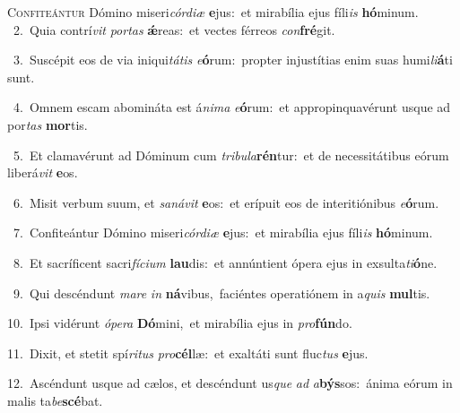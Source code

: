 \lettrine{\initial\textcolor{\initialcolor}{C}}{onfiteántur} Dómino miseri\-\textit{cór}\-\textit{di}\textit{æ} \textbf{e}\-jus:~\star et mirabília ejus fíli\textit{is} \textbf{hó}\-minum.\\
{\numbfont\textcolor{\numbcolor}{~2.}}~Quia contrí\textit{vit} \textit{por}\-\textit{tas} \textbf{ǽ}\-reas:~\star et vectes férreos \textit{con}\-\textbf{fré}git.\par
{\numbfont\textcolor{\numbcolor}{~3.}}~Suscépit eos de via iniqui\-\textit{tá}\-\textit{tis} \textit{e}\-\textbf{ó}rum:~\star propter injustítias enim suas humi\-\textit{li}\-\textbf{á}ti sunt.\par
{\numbfont\textcolor{\numbcolor}{~4.}}~Omnem escam abomináta est á\-\textit{ni}\-\textit{ma} \textit{e}\-\textbf{ó}rum:~\star et appropinquavérunt usque ad por\textit{tas} \textbf{mor}\-tis.\par
{\numbfont\textcolor{\numbcolor}{~5.}}~Et clamavérunt ad Dóminum cum \textit{tri}\-\textit{bu}\textit{la}\textbf{rén}tur:~\star et de necessitátibus eórum liberá\textit{vit} \textbf{e}\-os.\par
{\numbfont\textcolor{\numbcolor}{~6.}}~Misit verbum suum, et \textit{sa}\-\textit{ná}\textit{vit} \textbf{e}\-os:~\star et erípuit eos de interitiónibus \textit{e}\-\textbf{ó}rum.\par
{\numbfont\textcolor{\numbcolor}{~7.}}~Confiteántur Dómino miseri\-\textit{cór}\-\textit{di}\textit{æ} \textbf{e}\-jus:~\star et mirabília ejus fíli\textit{is} \textbf{hó}\-minum.\par
{\numbfont\textcolor{\numbcolor}{~8.}}~Et sacríficent sacri\-\textit{fí}\-\textit{ci}\textit{um} \textbf{lau}\-dis:~\star et annúntient ópera ejus in exsulta\-\textit{ti}\-\textbf{ó}ne.\par
{\numbfont\textcolor{\numbcolor}{~9.}}~Qui descéndunt \textit{ma}\-\textit{re} \textit{in} \textbf{ná}\-vibus,~\star faciéntes operatiónem in a\textit{quis} \textbf{mul}\-tis.\par
{\numbfont\textcolor{\numbcolor}{10.}}~Ipsi vidérunt \textit{ó}\-\textit{pe}\textit{ra} \textbf{Dó}\-mini,~\star et mirabília ejus in \textit{pro}\-\textbf{fún}do.\par
{\numbfont\textcolor{\numbcolor}{11.}}~Dixit, et stetit spí\-\textit{ri}\-\textit{tus} \textit{pro}\-\textbf{cél}læ:~\star et exaltáti sunt fluc\textit{tus} \textbf{e}\-jus.\par
{\numbfont\textcolor{\numbcolor}{12.}}~Ascéndunt usque ad cælos, et descéndunt us\textit{que} \textit{ad} \textit{a}\-\textbf{býs}sos:~\star ánima eórum in malis ta\-\textit{be}\-\textbf{scé}bat.\par
